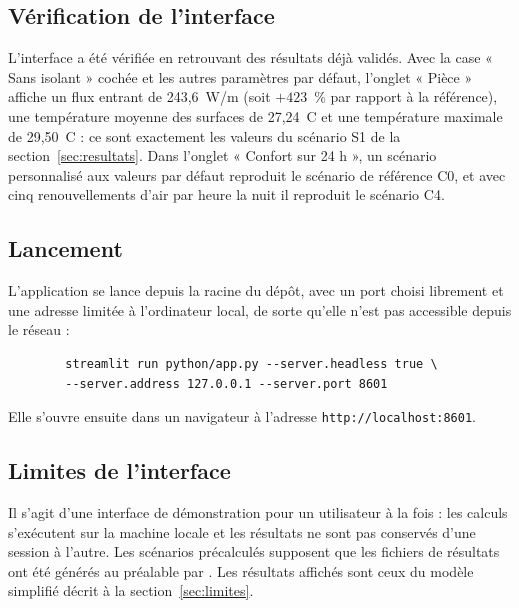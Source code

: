 \subsection{Vérification de l'interface}
L'interface a été vérifiée en retrouvant des résultats déjà validés. Avec la case « Sans isolant » cochée et les
autres paramètres par défaut, l'onglet « Pièce » affiche un flux entrant de 243,6~W/m (soit $+423$~\% par
rapport à la référence), une température moyenne des surfaces de 27,24~\textdegree C et une température
maximale de 29,50~\textdegree C : ce sont exactement les valeurs du scénario S1 de la section~\ref{sec:resultats}.
Dans l'onglet « Confort sur 24 h », un scénario personnalisé aux valeurs par défaut reproduit le scénario de
référence C0, et avec cinq renouvellements d'air par heure la nuit il reproduit le scénario C4.

\subsection{Lancement}
L'application se lance depuis la racine du dépôt, avec un port choisi librement et une adresse limitée à
l'ordinateur local, de sorte qu'elle n'est pas accessible depuis le réseau :
{\footnotesize
	\begin{verbatim}
		streamlit run python/app.py --server.headless true \
		--server.address 127.0.0.1 --server.port 8601
\end{verbatim}}
Elle s'ouvre ensuite dans un navigateur à l'adresse \texttt{http://localhost:8601}.

\subsection{Limites de l'interface}
Il s'agit d'une interface de démonstration pour un utilisateur à la fois : les calculs s'exécutent sur la
machine locale et les résultats ne sont pas conservés d'une session à l'autre. Les scénarios précalculés
supposent que les fichiers de résultats ont été générés au préalable par \fichier{run_cycles.py}. Les résultats
affichés sont ceux du modèle simplifié décrit à la section~\ref{sec:limites}.